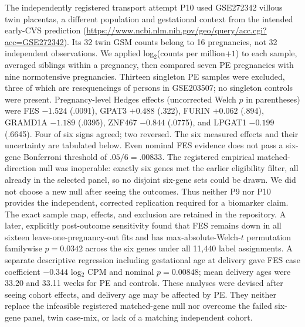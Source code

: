 \documentclass[11pt,a4paper]{article}
\begin{document}
The independently registered transport attempt P10 used GSE272342 villous twin placentas, a different population and gestational context from the intended early-CVS prediction (\url{https://www.ncbi.nlm.nih.gov/geo/query/acc.cgi?acc=GSE272342}). Its 32 twin GSM counts belong to 16 pregnancies, not 32 independent observations. We applied log$_2$(counts per million$+1$) to each sample, averaged siblings within a pregnancy, then compared seven PE pregnancies with nine normotensive pregnancies. Thirteen singleton PE samples were excluded, three of which are resequencings of persons in GSE203507; no singleton controls were present. Pregnancy-level Hedges effects (uncorrected Welch $p$ in parentheses) were FES $-1.524$ (.0091), GPAT3 $+0.488$ (.322), FURIN $+0.062$ (.894), GRAMD1A $-1.189$ (.0395), ZNF467 $-0.844$ (.0775), and LPGAT1 $-0.199$ (.6645). Four of six signs agreed; two reversed. The six measured effects and their uncertainty are tabulated below. Even nominal FES evidence does not pass a six-gene Bonferroni threshold of $.05/6=.00833$. The registered empirical matched-direction null was inoperable: exactly six genes met the earlier eligibility filter, all already in the selected panel, so no disjoint six-gene sets could be drawn. We did not choose a new null after seeing the outcomes. Thus neither P9 nor P10 provides the independent, corrected replication required for a biomarker claim. 
The exact sample map, effects, and exclusion are retained in the repository. A later, explicitly post-outcome sensitivity found that FES remains down in all sixteen leave-one-pregnancy-out fits and has max-absolute-Welch-$t$ permutation familywise $p=0.0342$ across the six genes under all 11,440 label assignments. A separate descriptive regression including gestational age at delivery gave FES case coefficient $-0.344$ log$_2$ CPM and nominal $p=0.00848$; mean delivery ages were 33.20 and 33.11 weeks for PE and controls. These analyses were devised after seeing cohort effects, and delivery age may be affected by PE. They neither replace the infeasible registered matched-gene null nor overcome the failed six-gene panel, twin case-mix, or lack of a matching independent cohort.
\end{document}

